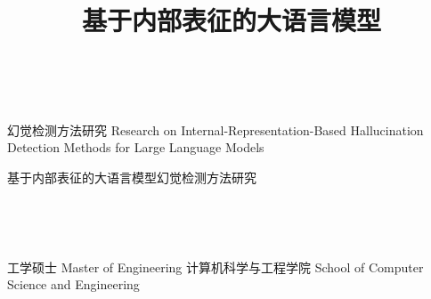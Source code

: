 \documentclass[algorithmlist,figurelist,tablelist]{seumasterthesis}
\begin{document}
\studentid{}              %

\title
    {基于内部表征的大语言模型}                                      %
    {幻觉检测方法研究}                                          %
    {Research on Internal-Representation-Based Hallucination Detection Methods for Large Language Models}  %
    {}            %

\spine
    {基于内部表征的大语言模型幻觉检测方法研究}      %
    {}                                                          %

\author
    {~}                        %
    {~}                 %

\advisor
    {~}                       %
    {~}           %
    {~}                     %


\degreetype                     %
    {工学硕士}
    {Master of Engineering}
\submajor{}               %
\authorizedate{}      %
\committeechair{}             %
\department                     %
    {计算机科学与工程学院}
    {School of Computer Science and Engineering}
\seuthesisthanks                %
    {}
\end{document}
